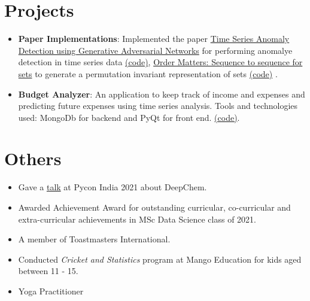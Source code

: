 \documentclass[letterpaper,11pt]{article}
\newcommand{\resumeItem}[2]{
  \item\small{
    \textbf{#1}{: #2 \vspace{-2pt}}
  }
}
\newcommand{\resumeItemSimple}[1]{
  \item\small{
    {#1 \vspace{-2pt}}
  }
}
\newcommand{\resumeSubItem}[2]{\resumeItem{#1}{#2}\vspace{-4pt}}
\newcommand{\resumeSubItemSimple}[1]{\resumeItemSimple{#1}\vspace{-4pt}}
\newcommand{\resumeSubHeadingListStart}{\begin{itemize}[leftmargin=*]}
\newcommand{\resumeSubHeadingListEnd}{\end{itemize}}
\begin{document}
\section{Projects}
  \resumeSubHeadingListStart
    \resumeSubItem{Paper Implementations}
      {Implemented the paper \href{https://arxiv.org/abs/2009.07769}{Time Series Anomaly Detection using Generative Adversarial Networks} for performing anomalye detection in time series data \href{https://github.com/arunppsg/tadGAN}{(code)}, \href{https://arxiv.org/abs/1511.06391}{Order Matters: Sequence to sequence for sets} to generate a permutation invariant representation of sets \href{https://github.com/arunppsg/set2set}{(code)}}.
    \resumeSubItem{Budget Analyzer}
      {An application to keep track of income and expenses and predicting future expenses using time series analysis. Tools and technologies used: MongoDb for backend and PyQt for front end. \href{https://github.com/arunppsg/budget-analyzer}{(code)}.}
  \resumeSubHeadingListEnd

\section{Others}
  \resumeSubHeadingListStart
    \resumeSubItemSimple {Gave a \href{https://www.youtube.com/watch?v=JEFrzjpf6d0}{talk} at Pycon India 2021 about DeepChem.}
    \resumeSubItemSimple {Awarded Achievement Award for outstanding curricular, co-curricular and extra-curricular achievements in MSc Data Science class of 2021.}
    \resumeSubItemSimple {A member of Toastmasters International.}
    \resumeSubItemSimple {Conducted \textit{Cricket and Statistics} program at Mango Education for kids aged between 11 - 15.}
    \resumeSubItemSimple {Yoga Practitioner}
  \resumeSubHeadingListEnd
%
%
\end{document}
